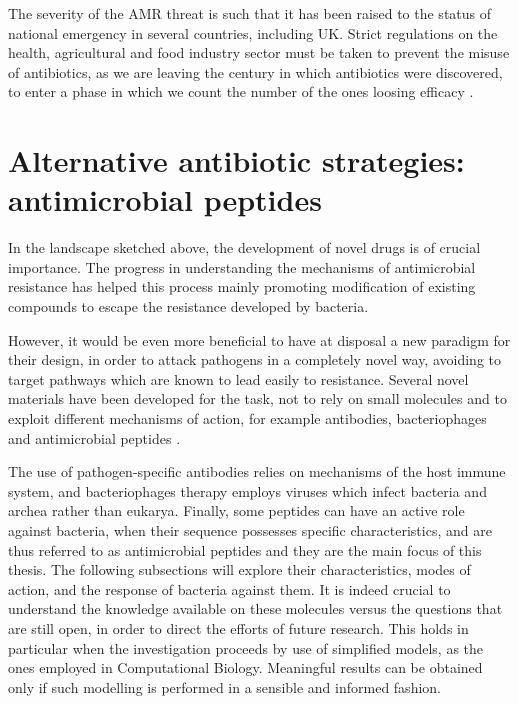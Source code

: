 The severity of the AMR threat is such that it has been raised to the status of national emergency in several countries, including UK. Strict regulations on the health, agricultural and food industry sector must be taken to prevent the misuse of antibiotics, as we are leaving the century in which antibiotics were discovered, to enter a phase in which we count the number of the ones loosing efficacy \citep{Oneill2016}.


\section{Alternative antibiotic strategies: antimicrobial peptides}
In the landscape sketched above, the development of novel drugs is of crucial importance. The progress in understanding the mechanisms of antimicrobial resistance has helped this process mainly promoting modification of existing compounds to escape the resistance developed by bacteria.

However, it would be even more beneficial to have at disposal a new paradigm for their design, in order to attack pathogens in a completely novel way, avoiding to target pathways which are known to lead easily to resistance. Several novel materials have been developed for the task, not to rely on small molecules and to exploit different mechanisms of action, for example antibodies, bacteriophages and antimicrobial peptides \citep{Mantravadi2019}.

The use of pathogen-specific antibodies relies on mechanisms of the host immune system, and bacteriophages therapy employs viruses which infect bacteria and archea rather than eukarya.
%
Finally, some peptides can have an active role against bacteria, when their sequence possesses specific characteristics, and are thus referred to as antimicrobial peptides and they are the main focus of this thesis. The following subsections will explore their characteristics, modes of action, and the response of bacteria against them. It is indeed crucial to understand the knowledge available on these molecules versus the questions that are still open, in order to direct the efforts of future research. This holds in particular when the investigation proceeds by use of simplified models, as the ones employed in Computational Biology. Meaningful results can be obtained only if such modelling is performed in a sensible and informed fashion.

